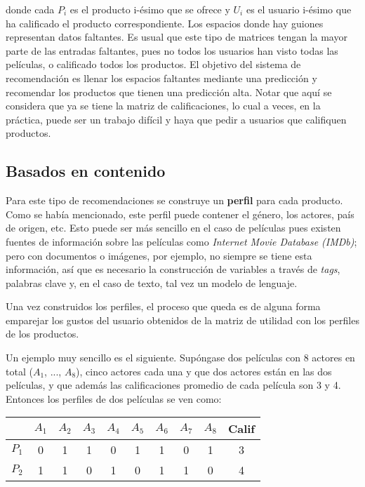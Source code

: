 donde cada $P_i$ es el producto i-ésimo que se ofrece y $U_i$ es el usuario i-ésimo que ha calificado el producto correspondiente. Los espacios donde hay guiones representan datos faltantes. Es usual que este tipo de matrices tengan la mayor parte de las entradas faltantes, pues no todos los usuarios han visto todas las películas, o calificado todos los productos. El objetivo del sistema de recomendación es llenar los espacios faltantes mediante una predicción y recomendar los productos que tienen una predicción alta. Notar que aquí se considera que ya se tiene la matriz de calificaciones, lo cual a veces, en la práctica, puede ser un trabajo difícil y haya que pedir a usuarios que califiquen productos.

\subsection{Basados en contenido}

Para este tipo de recomendaciones se construye un \textbf{perfil} para cada producto. Como se había mencionado, este perfil puede contener el género, los actores, país de origen, etc. Esto puede ser más sencillo en el caso de películas pues existen fuentes de información sobre las películas como \textit{Internet Movie Database (IMDb)}; pero con documentos o imágenes, por ejemplo, no siempre se tiene esta información, así que es necesario la construcción de variables a través de \textit{tags}, palabras clave y, en el caso de texto, tal vez un modelo de lenguaje.

Una vez construidos los perfiles, el proceso que queda es de alguna forma emparejar los gustos del usuario obtenidos de la matriz de utilidad con los perfiles de los productos.

Un ejemplo muy sencillo es el siguiente. Supóngase dos películas con 8 actores en total ($A_1$, ..., $A_8$), cinco actores cada una y que dos actores están en las dos películas, y que además las calificaciones promedio de cada película son 3 y 4. Entonces los perfiles de dos películas se ven como:

\begin{center}
  \begin{tabular}{ c | c  c c c c c c c c}
      & $A_1$ & $A_2$ & $A_3$ & $A_4$ & $A_5$ & $A_6$ & $A_7$ & $A_8$ & Calif \\
      \hline                       
      $P_1$ & 0 & 1 & 1 & 0 & 1 & 1 & 0 & 1 & 3 \\
      $P_2$ & 1 & 1 & 0 & 1 & 0 & 1 & 1 & 0 & 4 \\
      \hline  
  \end{tabular}
\end{center}

